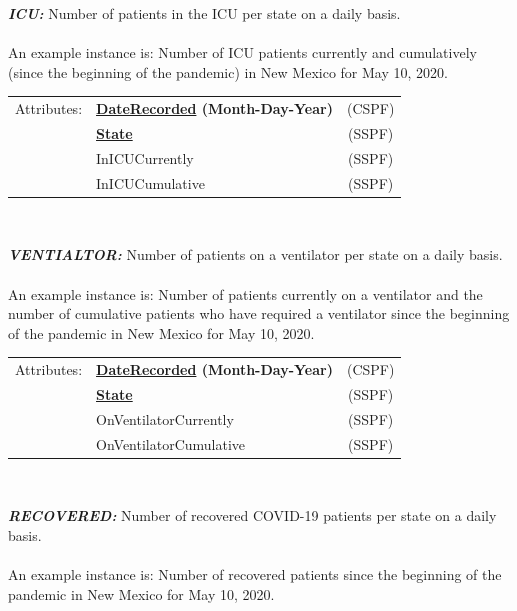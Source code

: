 \documentclass[11pt]{article}
\begin{document}
\begin{description}
\item{\em\bf ICU:} Number of patients in the ICU per state on a daily basis. \\ \\

An example instance is: Number of ICU patients currently and cumulatively (since the beginning of the pandemic) in New Mexico for May 10, 2020. \\
 
\begin{tabular}{llc}
 Attributes: & {\bf \underline{DateRecorded} (Month-Day-Year)} &  (CSPF) \\
	    & {\bf \underline{State}} &  (SSPF) \\
	    & InICUCurrently & (SSPF) \\
	    & InICUCumulative & (SSPF) \\
\end{tabular} \\

\item{\em\bf VENTIALTOR:} Number of patients on a ventilator per state on a daily basis. \\ \\

An example instance is: Number of patients currently on a ventilator and the number of cumulative patients who have required a ventilator since the beginning of the pandemic in New Mexico for May 10, 2020. \\
 
\begin{tabular}{llc}
 Attributes: & {\bf \underline{DateRecorded} (Month-Day-Year)} &  (CSPF) \\
	    & {\bf \underline{State}} &  (SSPF) \\
	    & OnVentilatorCurrently & (SSPF) \\
	    & OnVentilatorCumulative & (SSPF) \\
\end{tabular} \\

\pagebreak

\item{\em\bf RECOVERED:} Number of recovered COVID-19 patients per state on a daily basis. \\ \\

An example instance is: Number of recovered patients since the beginning of the pandemic in New Mexico for May 10, 2020. \\
 

\end{description}
\end{document}
